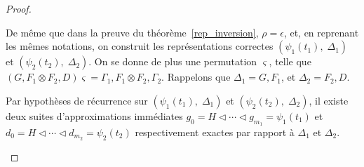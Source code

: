 \documentclass[11pt,a4paper]{article}
\theoremstyle{plain}
\theoremstyle{definition}
\theoremstyle{remark}
\newcommand*{\tensor}{\otimes}
\newcommand*{\permapp}[2]{#2 #1}
\newcommand*{\someperm}{\varsigma}
\newcommand*{\sequent}{\Gamma}
\newcommand*{\sequentbis}{\Delta}
\newcommand*{\relapprox}{\ensuremath{\triangleleft}}
\begin{document}
\begin{proof}
\begin{description}
            De même que dans la preuve du théorème~\ref{rep_inversion}, $\rho = \epsilon$, et, en reprenant les mêmes notations, on construit les représentations correctes $\left( \psi_1 \left( t_1 \right), \; \sequentbis_1 \right)$ et $\left( \psi_2 \left( t_2 \right), \; \sequentbis_2 \right)$. On se donne de plus une permutation $\someperm$, telle que $\permapp{\someperm}{(G, F_1 \tensor F_2, D)} = \sequent_1, F_1 \tensor F_2, \sequent_2$. Rappelons que $\sequentbis_1 = G, F_1$, et $\sequentbis_2 = F_2, D$.
    
            Par hypothèses de récurrence sur $\left( \psi_1 \left( t_1 \right), \; \sequentbis_1 \right)$ et $\left( \psi_2 \left( t_2 \right), \; \sequentbis_2 \right)$, il existe deux suites d'approximations immédiates $g_0 = H \relapprox \cdots \relapprox g_{m_1} = \psi_1 \left( t_1 \right)$ et $d_0 = H \relapprox \cdots \relapprox d_{m_2} = \psi_2 \left( t_2 \right)$ respectivement exactes par rapport à $\sequentbis_1$ et $\sequentbis_2$.
    

\end{description}
\end{proof}
\end{document}
